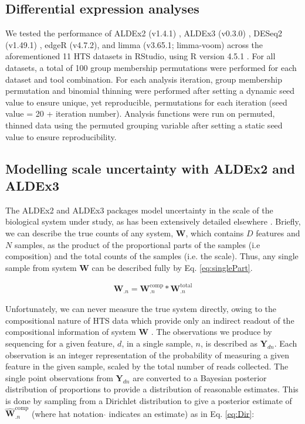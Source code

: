 \documentclass[10pt,letterpaper]{article}
\begin{document}
\subsection*{Differential expression analyses}
We tested the performance of ALDEx2 (v1.4.1) \cite{fernandes:2014}, ALDEx3 (v0.3.0) \cite{konnaris_uncertainty_2025}, DESeq2 (v1.49.1) \cite{love_moderated_2014}, edgeR (v4.7.2), and limma (v3.65.1; limma-voom) \cite{ritchie_limma_2015} across the aforementioned 11 HTS datasets in RStudio, using R version 4.5.1 \cite{r_core_2025}. For all datasets, a total of 100 group membership permutations were performed for each dataset and tool combination. For each analysis iteration, group membership permutation and binomial thinning were performed after setting a dynamic seed value to ensure unique, yet reproducible, permutations for each iteration (seed value = 20 + iteration number). Analysis functions were run on permuted, thinned data using the permuted grouping variable after setting a static seed value to ensure reproducibility. 

\subsection*{Modelling scale uncertainty with ALDEx2 and ALDEx3}
The ALDEx2 and ALDEx3 packages model uncertainty in the scale of the biological system under study, as has been extensively detailed elsewhere \cite{nixon_incorporating_2025, gloor_explicit_2025}. Briefly, we can describe the true counts of any system, $\mathbf{W}$, which contains $D$ features and $N$ samples, as the product of the proportional parts of the samples (i.e composition) and the total counts of the samples (i.e. the scale). Thus, any single sample from system $\mathbf{W}$ can be described fully by Eq. \ref{eq:singlePart}.

\begin{eqnarray}
	\label{eq:singlePart}
	\mathbf{W}_{.n} = \mathbf{W}^{\mathrm{comp}}_{.n} * \mathbf{W}^{\mathrm{total}}_{.n} 
\end{eqnarray}

Unfortunately, we can never measure the true system directly, owing to the compositional nature of HTS data which provide only an indirect readout of the compositional information of system $\mathbf{W}$ \cite{lovell_proportions_2011, gloor_microbiome_2017}. The observations we produce by sequencing for a given feature, $d$, in a single sample, $n$, is described as $\mathbf{Y}_{dn}$. Each observation is an integer representation of the probability of measuring a given feature in the given sample, scaled by the total number of reads collected\cite{fernandes:2013}. The single point observations from $\mathbf{Y}_{dn}$ are converted to a Bayesian posterior distribution of proportions \cite{fernandes:2013} to provide a distribution of reasonable estimates. This is done by sampling from a Dirichlet distribution to give a posterior estimate of $\hat{\mathbf{W}}^{\mathrm{comp}}_{.n}$ \cite{fernandes:2014} (where hat notation $\hat{}$ indicates an estimate) as in Eq. \ref{eq:Dir}:
\end{document}
